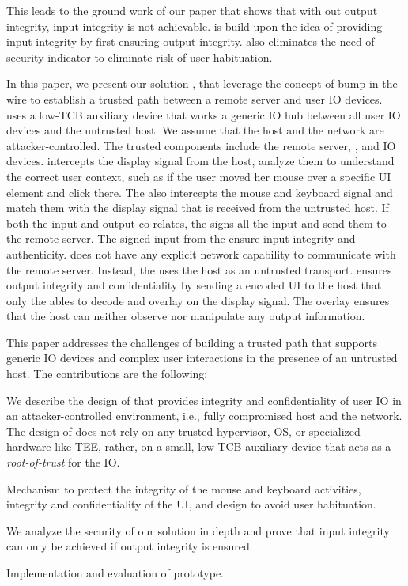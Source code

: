  This leads to the ground work of our paper that shows that with out output integrity, input integrity is not achievable. \name is build upon the idea of providing input integrity by first ensuring output integrity. \name also eliminates the need of security indicator to eliminate risk of user habituation. 
 
 In this paper, we present our solution \name, that leverage the concept of bump-in-the-wire to establish a trusted path between a remote server and user IO devices. \name uses a low-TCB auxiliary device that works a generic IO hub between all user IO devices and the untrusted host. 
We assume that the host and the network are attacker-controlled. The trusted components include the remote server, \device, and IO devices. \device intercepts the display signal from the host, analyze them to understand the correct user context, such as if the user moved her mouse over a specific UI element and click there. The \device also intercepts the mouse and keyboard signal and match them with the display signal that is received from the untrusted host. If both the input and output co-relates, the \device signs all the input and send them to the remote server. The signed input from the \device ensure input integrity and authenticity. \device does not have any explicit network capability to communicate with the remote server. Instead, the \device uses the host as an untrusted transport. \device ensures output integrity and confidentiality by sending a encoded UI to the host that only the \device ables to decode and overlay on the display signal. The overlay ensures that the host can neither observe nor manipulate any output information. 


 This paper addresses the challenges of building a trusted path that supports generic IO devices and complex user interactions in the presence of an untrusted host. The contributions are the following: 
\begin{mybullet}
  \item We describe the design of \name that provides integrity and confidentiality of user IO in an attacker-controlled environment, i.e., fully compromised host and the network. The design of \name does not rely on any trusted hypervisor, OS, or specialized hardware like TEE, rather, on a small, low-TCB auxiliary device that acts as a \emph{root-of-trust} for the IO.
  \item Mechanism to protect the integrity of the mouse and keyboard activities, integrity and confidentiality of the UI, and design to avoid user habituation. 
  \item We analyze the security of our solution in depth and prove that input integrity can only be achieved if output integrity is ensured.
  \item Implementation and evaluation of \name prototype.
\end{mybullet}

